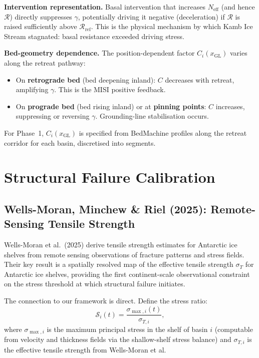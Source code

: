 \documentclass[11pt]{article}
\theoremstyle{definition}
\begin{document}
\textbf{Intervention representation.}  Basal intervention that increases $N_{\text{eff}}$ (and hence $\mathcal{R}$) directly suppresses $\gamma$, potentially driving it negative (deceleration) if $\mathcal{R}$ is raised sufficiently above $\mathcal{R}_{\text{ref}}$.  This is the physical mechanism by which Kamb Ice Stream stagnated: basal resistance exceeded driving stress.

\textbf{Bed-geometry dependence.}  The position-dependent factor $C_i(x_\text{GL})$ varies along the retreat pathway:
\begin{itemize}
  \item On \textbf{retrograde bed} (bed deepening inland): $C$ decreases with retreat, amplifying $\gamma$.  This is the MISI positive feedback.
  \item On \textbf{prograde bed} (bed rising inland) or at \textbf{pinning points}: $C$ increases, suppressing or reversing $\gamma$.  Grounding-line stabilisation occurs.
\end{itemize}

For Phase~1, $C_i(x_\text{GL})$ is specified from BedMachine profiles along the retreat corridor for each basin, discretised into segments.


\section{Structural Failure Calibration}
\label{sec:damage_calibration}

\subsection{Wells-Moran, Minchew \& Riel (2025): Remote-Sensing Tensile Strength}

Wells-Moran et al.\ (2025) derive tensile strength estimates for Antarctic ice shelves from remote sensing observations of fracture patterns and stress fields.  Their key result is a spatially resolved map of the effective tensile strength $\sigma_{T}$ for Antarctic ice shelves, providing the first continent-scale observational constraint on the stress threshold at which structural failure initiates.

The connection to our framework is direct.  Define the stress ratio:
\begin{equation}
  \mathcal{S}_i(t) = \frac{\sigma_{\max,i}(t)}{\sigma_{T,i}},
  \label{eq:stress_ratio}
\end{equation}
where $\sigma_{\max,i}$ is the maximum principal stress in the shelf of basin $i$ (computable from velocity and thickness fields via the shallow-shelf stress balance) and $\sigma_{T,i}$ is the effective tensile strength from Wells-Moran et al.
\end{document}
